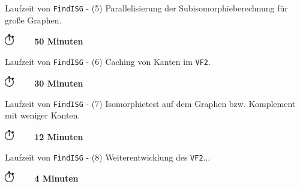 \begin{frame}[<+->]{Laufzeit von \texttt{FindISG} - (5)}{}
  {\beamerblue Parallelisierung der Subisomorphieberechnung für große Graphen.\newline}
  \begin{figure}
    \centering
    
  \end{figure}
  \begin{center}
    \includegraphics[width=0.4cm]{stop-watch-icon.png} \bf ~~~ 50 Minuten
  \end{center}
\end{frame}

\begin{frame}[<+->]{Laufzeit von \texttt{FindISG} - (6)}{}
  {\beamerblue Caching von Kanten im \texttt{VF2}.\newline}
  \begin{figure}
    \centering
    
  \end{figure}
  \begin{center}
    \includegraphics[width=0.4cm]{stop-watch-icon.png} \bf ~~~ 30 Minuten
  \end{center}
\end{frame}

\begin{frame}[<+->]{Laufzeit von \texttt{FindISG} - (7)}{}
  {\beamerblue Isomorphietest auf dem Graphen bzw. Komplement mit weniger Kanten.\newline}
  \begin{figure}
    \centering
    
  \end{figure}
  \begin{center}
    \includegraphics[width=0.4cm]{stop-watch-icon.png} \bf ~~~ 12 Minuten
  \end{center}
\end{frame}

\begin{frame}[<+->]{Laufzeit von \texttt{FindISG} - (8)}{}
  {\beamerblue Weiterentwicklung des \texttt{VF2}...\newline}
  \begin{figure}
    \centering
    
  \end{figure}
  \begin{center}
    \includegraphics[width=0.4cm]{stop-watch-icon.png} \bf ~~~ 4 Minuten
  \end{center}
\end{frame}

